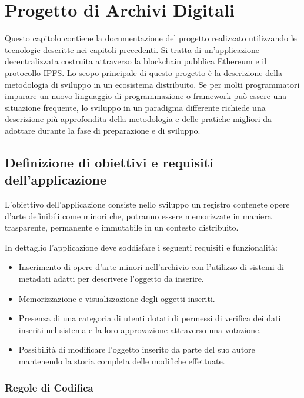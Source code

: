 \chapter{Progetto di Archivi Digitali}
\label{ch:archivi}

Questo capitolo contiene la documentazione del progetto realizzato utilizzando le tecnologie descritte nei capitoli precedenti. Si tratta di un’applicazione decentralizzata costruita attraverso la blockchain pubblica Ethereum e il protocollo IPFS. Lo scopo principale di questo progetto è la descrizione della metodologia di sviluppo in un ecosistema distribuito. Se per molti programmatori imparare un nuovo linguaggio di programmazione o framework può essere una situazione frequente, lo sviluppo in un paradigma differente richiede una descrizione più approfondita della metodologia e delle pratiche migliori da adottare durante la fase di preparazione e di sviluppo.

\section{Definizione di obiettivi e requisiti dell’applicazione}

L’obiettivo dell'applicazione consiste nello sviluppo un registro contenete opere d’arte definibili come minori che, potranno essere memorizzate in maniera trasparente, permanente e immutabile in un contesto distribuito. 

In dettaglio l’applicazione deve soddisfare i seguenti requisiti e funzionalità:

\begin{itemize}
\item Inserimento di opere d’arte minori nell’archivio con l’utilizzo di sistemi di metadati adatti per descrivere l’oggetto da inserire.
\item Memorizzazione e visualizzazione degli oggetti inseriti.
\item Presenza di una categoria di utenti dotati di permessi di verifica dei dati inseriti nel sistema e la loro approvazione attraverso una votazione.
\item Possibilità di modificare l’oggetto inserito da parte del suo autore mantenendo la storia completa delle modifiche effettuate.
\end{itemize}

\subsection{Regole di Codifica}

